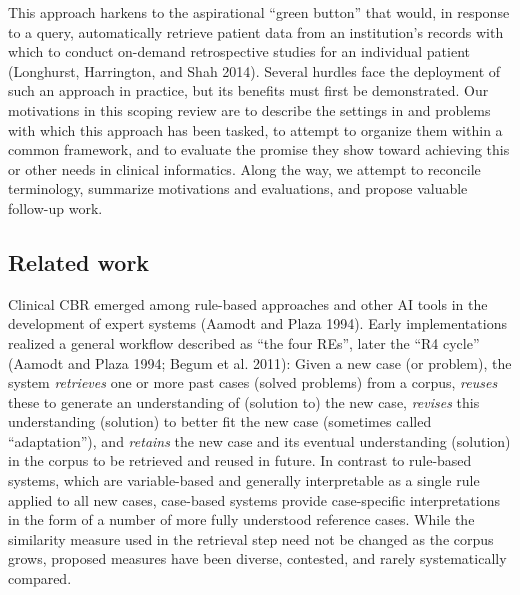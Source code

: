 \documentclass{article}
\begin{document}
This approach harkens to the aspirational ``green button'' that would,
in response to a query, automatically retrieve patient data from an
institution's records with which to conduct on-demand retrospective
studies for an individual patient (Longhurst, Harrington, and Shah
2014). Several hurdles face the deployment of such an approach in
practice, but its benefits must first be demonstrated. Our motivations
in this scoping review are to describe the settings in and problems with
which this approach has been tasked, to attempt to organize them within
a common framework, and to evaluate the promise they show toward
achieving this or other needs in clinical informatics. Along the way, we
attempt to reconcile terminology, summarize motivations and evaluations,
and propose valuable follow-up work.

\hypertarget{related-work}{%
\subsection{Related work}\label{related-work}}

Clinical CBR emerged among rule-based approaches and other AI tools in
the development of expert systems (Aamodt and Plaza 1994). Early
implementations realized a general workflow described as ``the four
REs'', later the ``R4 cycle'' (Aamodt and Plaza 1994; Begum et al.
2011): Given a new case (or problem), the system \emph{retrieves} one or
more past cases (solved problems) from a corpus, \emph{reuses} these to
generate an understanding of (solution to) the new case, \emph{revises}
this understanding (solution) to better fit the new case (sometimes
called ``adaptation''), and \emph{retains} the new case and its eventual
understanding (solution) in the corpus to be retrieved and reused in
future. In contrast to rule-based systems, which are variable-based and
generally interpretable as a single rule applied to all new cases,
case-based systems provide case-specific interpretations in the form of
a number of more fully understood reference cases. While the similarity
measure used in the retrieval step need not be changed as the corpus
grows, proposed measures have been diverse, contested, and rarely
systematically compared.
\end{document}
